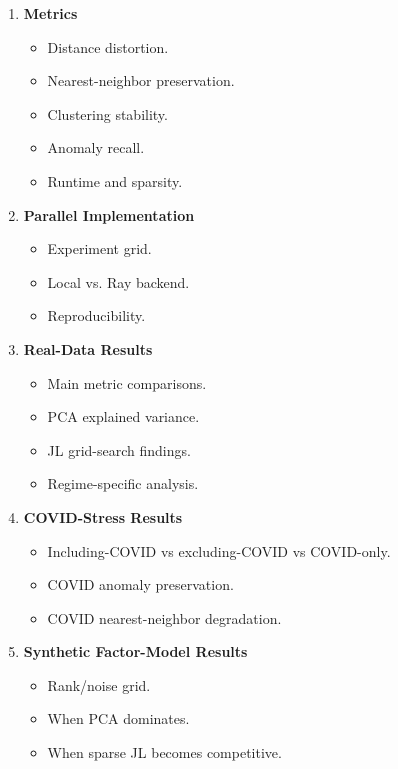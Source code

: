 \documentclass[11pt]{article}
\begin{document}
\begin{enumerate}
    \item \textbf{Metrics}
    \begin{itemize}
        \item Distance distortion.
        \item Nearest-neighbor preservation.
        \item Clustering stability.
        \item Anomaly recall.
        \item Runtime and sparsity.
    \end{itemize}

    \item \textbf{Parallel Implementation}
    \begin{itemize}
        \item Experiment grid.
        \item Local vs. Ray backend.
        \item Reproducibility.
    \end{itemize}

    \item \textbf{Real-Data Results}
    \begin{itemize}
        \item Main metric comparisons.
        \item PCA explained variance.
        \item JL grid-search findings.
        \item Regime-specific analysis.
    \end{itemize}

    \item \textbf{COVID-Stress Results}
    \begin{itemize}
        \item Including-COVID vs excluding-COVID vs COVID-only.
        \item COVID anomaly preservation.
        \item COVID nearest-neighbor degradation.
    \end{itemize}

    \item \textbf{Synthetic Factor-Model Results}
    \begin{itemize}
        \item Rank/noise grid.
        \item When PCA dominates.
        \item When sparse JL becomes competitive.
    \end{itemize}


\end{enumerate}
\end{document}
